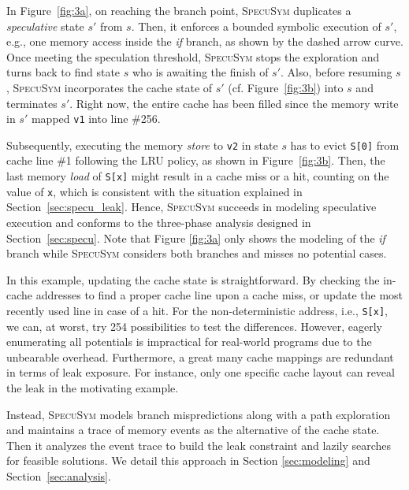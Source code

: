 \documentclass[sigconf,screen]{acmart}
\newcommand\ignore[1]{}
\newcommand{\SpecuSym}{\textsc{SpecuSym} }
\begin{document}
In Figure~\ref{fig:3a}, on reaching the branch point, \SpecuSym duplicates a 
\textit{speculative} state $s'$ from $s$. Then, it enforces a bounded symbolic 
execution of $s'$, e.g., one memory access inside the \textit{if} branch, as 
shown by the dashed arrow curve. Once meeting the speculation threshold, 
\SpecuSym stops the exploration and turns back to find state $s$ who is awaiting 
the finish of $s'$. Also, before resuming $s$, \SpecuSym incorporates the cache 
state of $s'$ (cf. Figure~\ref{fig:3b}) into $s$ and terminates $s'$. Right now, 
the entire cache has been filled since the memory write in $s'$ mapped \texttt{v1} 
into line \#256. 


Subsequently, executing the memory \emph{store} to \texttt{v2} in state $s$ has
to evict \texttt{S[0]} from cache line \#1 following the LRU policy, as shown in 
Figure~\ref{fig:3b}. Then, the last memory \emph{load} of \texttt{S[x]} might 
result in a cache miss or a hit, counting on the value of \texttt{x}, which is 
consistent with the situation explained in Section~\ref{sec:specu_leak}. Hence, 
\SpecuSym succeeds in modeling speculative execution and conforms to the 
three-phase analysis designed in Section~\ref{sec:specu}. Note that Figure
\ref{fig:3a} only shows the modeling of the \emph{if} branch while \SpecuSym 
considers both branches and misses no potential cases. 


\ignore{
In Figure~\ref{fig:3a}, the speculative state $s'$ inherits the cache 
state from $s$, maps \texttt{v2} into a cache line, and merges back the updated 
cache state to state $s$ before its termination, as formally stated in Algorithm
\ref{alg:specusym} (lines 23-25). 
}


In this example, updating the cache state is straightforward. By checking the 
in-cache addresses to find a proper cache line upon a cache miss, or update the 
most recently used line in case of a hit. For the non-deterministic address, i.e., 
\texttt{S[x]}, we can, at worst, try 254 possibilities to test the differences. 
However, eagerly enumerating all potentials is impractical for real-world programs 
due to the unbearable overhead. Furthermore, a great many cache mappings are
redundant in terms of leak exposure. For instance, only one specific cache layout 
can reveal the leak in the motivating example. 


Instead, \SpecuSym models branch mispredictions along with a path exploration 
and maintains a trace of memory events as the alternative of the cache state. 
Then it analyzes the event trace to build the leak constraint and lazily 
searches for feasible solutions. We detail this approach in Section
\ref{sec:modeling} and Section~\ref{sec:analysis}. 
\end{document}
